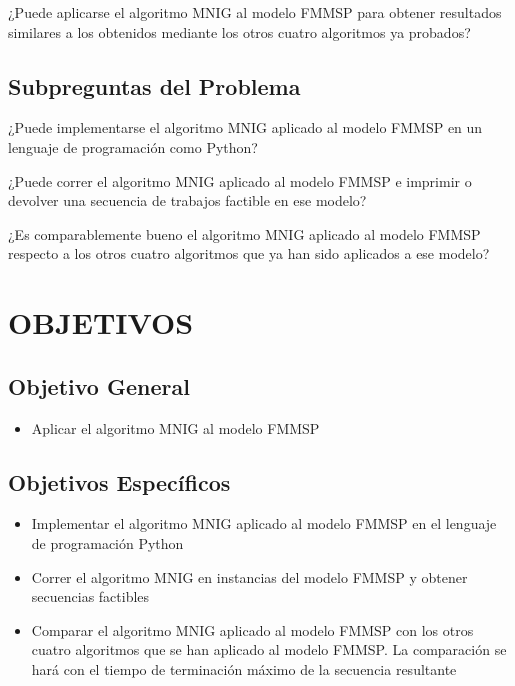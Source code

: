 \documentclass{article}
\begin{document}
¿Puede aplicarse el algoritmo MNIG al modelo FMMSP para obtener resultados
similares a los obtenidos mediante los otros cuatro algoritmos ya probados?

\subsection{Subpreguntas del Problema}

\indent\indent
¿Puede implementarse el algoritmo MNIG aplicado al modelo FMMSP en un lenguaje
de programación como Python?

¿Puede correr el algoritmo MNIG aplicado al modelo FMMSP e imprimir o devolver
una secuencia de trabajos factible en ese modelo?

¿Es comparablemente bueno el algoritmo MNIG aplicado al modelo FMMSP respecto
a los otros cuatro algoritmos que ya han sido aplicados a ese modelo?

\section{OBJETIVOS}

\subsection{Objetivo General}

\begin{itemize}
    \item Aplicar el algoritmo MNIG al modelo FMMSP
\end{itemize}

\subsection{Objetivos Específicos}

\begin{itemize}
    \item Implementar el algoritmo MNIG aplicado al modelo FMMSP en el
    \linebreak lenguaje de programación Python
    \item Correr el algoritmo MNIG en instancias del modelo FMMSP y
    obtener secuencias factibles
    \item Comparar el algoritmo MNIG aplicado al modelo FMMSP con los otros
    cuatro algoritmos que se han aplicado al modelo FMMSP. La comparación se
    hará con el tiempo de terminación máximo de la secuencia resultante
\end{itemize}
\end{document}
